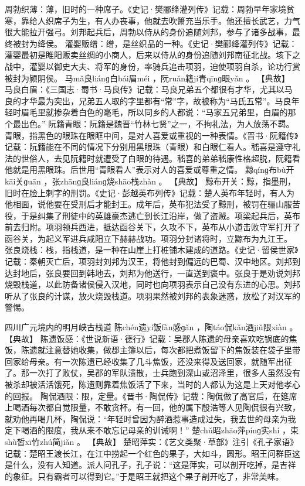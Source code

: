 \documentclass[12pt,UTF8]{ctexbook}
\begin{document}
周勃织薄：薄，旧时的一种席子。《史记·樊郦绛灌列传》记载：周勃早年家境贫寒，靠给人织席子为生，有人办丧事，他就去吹箫充当乐手。他还擅长武艺，力气很大能拉开强弓。刘邦起兵后，周勃以侍从的身份追随刘邦，参与了诸多战事，最终被封为绛侯。
灌婴贩缯：缯，是丝织品的一种。《史记·樊郦绛灌列传》记载：灌婴最初是睢阳贩卖丝绸的小商人，后来以侍从的身份追随刘邦南征北战。垓下之战中，灌婴以御史大夫、将军的身份，率骑兵追击项羽，迫使项羽自杀，论功行赏被封为颍阴侯。
马mǎ良liánɡ白bái眉méi
，阮ruǎn籍jí青qīnɡ眼yǎn
。
【典故】
马良白眉：《三国志·蜀书·马良传》记载：马良兄弟五个都很有才华，尤其以马良的才华最为突出，兄弟五人取的字里都有“常”字，故被称为“马氏五常”。马良年轻时眉毛里就掺杂着白色的毫毛，所以同乡的人都说：“马家五兄弟里，白眉的那个最出色。”
阮籍青眼：阮籍是魏晋“竹林七贤”之一，不拘礼法，为人放荡不羁。青眼，指黑色的眼珠在眼眶中间，是对人喜爱或重视的一种表情。《晋书·阮籍传》记载：阮籍能在不同的情况下分别用黑眼珠（青眼）和白眼仁看人。嵇喜是遵守礼法的世俗人，去见阮籍时就遭受了白眼的待遇。嵇喜的弟弟嵇康性格超脱，阮籍看他就是用黑眼珠。后世用“青眼看人”表示对人的喜爱或尊重之情。
黥qínɡ布bù开kāi关ɡuān
，张zhānɡ良liánɡ烧shāo栈zhàn
。
【典故】
黥布开关：黥，指墨刑，旧时在脸上刺字的刑罚。《史记·彭越英布列传》记载：楚人英布年轻时，有人为他相面，说他要在受刑后才能封王。成年后，英布犯法受了黥刑，被罚在骊山服苦役，于是纠集了刑徒中的英雄豪杰逃亡到长江沿岸，做了盗贼。项梁起兵后，英布前去归附。项羽领兵西进，抵达函谷关下，久攻不下，英布从小道击败守军打开了函谷关，为起义军进兵咸阳立下赫赫战功。项羽分封诸将时，立黥布为九江王。
张良烧栈：栈，指栈道，是一种在山崖上打桩铺木建成的道路。《史记·留侯世家》记载：秦朝灭亡后，项羽封刘邦为汉王，将他封到偏远的巴蜀、汉中地区。刘邦到达封地后，张良要回到韩地去，刘邦为他送行，一直送到褒中。张良于是劝说刘邦烧毁栈道，以此防备诸侯侵入汉地，同时也向项羽表示自己没有东进的心思。刘邦听从了张良的计谋，放火烧毁栈道。项羽果然被刘邦的表象迷惑，放松了对汉军的警惕。

四川广元境内的明月峡古栈道
陈chén遗yí饭fàn感ɡǎn
，陶táo侃kǎn酒jiǔ限xiàn
。
【典故】
陈遗饭感：《世说新语·德行》记载：吴郡人陈遗的母亲喜欢吃锅底的焦饭，陈遗就注意替她收集，做郡主簿以后，每次都把煮饭留下的焦饭装在袋子里带回家给母亲。有一次陈遗已经收集了几斗焦饭，还没来得及送回家，就随军出征了。那一次打了败仗，吴郡的军队溃散，士兵跑到深山或沼泽里，很多人虽然没有被杀却被活活饿死，陈遗则靠着焦饭活了下来，当时的人都认为这是上天对他孝心的回报。
陶侃酒限：限，定量。《晋书·陶侃传》记载：陶侃做了高官后，在筵席上喝酒每次都自觉限量，不敢贪杯。有一回，他的属下殷浩等人见陶侃很有兴致，就劝他再喝几杯，陶侃说：“年轻时曾因为醉酒惹事造成过失，我去世的母亲为我定下喝酒的限度，我从来不敢忘记母亲的训诫啊！”
楚chǔ昭zhāo萍pínɡ实shí
，束shù皙xī竹zhú简jiǎn
。
【典故】
楚昭萍实：《艺文类聚·草部》注引《孔子家语》记载：楚昭王渡长江，在江中捞起一个红色的果子，大如斗，圆形。昭王问群臣这是什么，没有人知道。派人问孔子，孔子说：“这是萍实，可以剖开吃掉，是吉祥的象征。只有霸者可以得到它。”于是昭王就把这个果子剖开吃了，非常美味。
\end{document}
